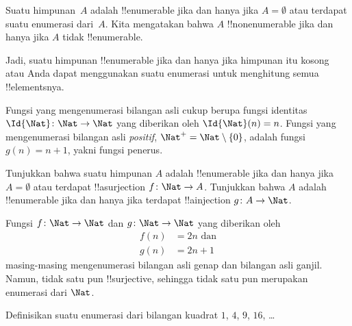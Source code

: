 \documentclass[../../../include/open-logic-section]{subfiles}
\begin{document}
\begin{defn}
  Suatu himpunan~$A$ adalah !!{enumerable} jika dan hanya jika $A =
  \emptyset$ atau terdapat suatu enumerasi dari~$A$. Kita mengatakan bahwa
  $A$ !!{nonenumerable} jika dan hanya jika $A$ tidak !!{enumerable}.
\end{defn}

\begin{explain}
Jadi, suatu himpunan !!{enumerable} jika dan hanya jika himpunan itu kosong
atau Anda dapat menggunakan suatu enumerasi untuk menghitung semua
!!{element}snya.
\end{explain}

\begin{ex}
Fungsi yang mengenumerasi bilangan asli cukup berupa fungsi identitas
$\Id{\Nat} \colon \Nat \to \Nat$ yang diberikan oleh $\Id{\Nat}(n) = n$.
Fungsi yang mengenumerasi bilangan asli \emph{positif}, $\Nat^+ = \Nat
\setminus \{0\}$, adalah fungsi $g(n) = n + 1$, yakni fungsi penerus.
\end{ex}

\begin{prob}
Tunjukkan bahwa suatu himpunan $A$ adalah !!{enumerable} jika dan hanya jika
$A = \emptyset$ atau terdapat !!a{surjection} $f\colon \Nat \to A$. Tunjukkan
bahwa $A$ adalah !!{enumerable} jika dan hanya jika terdapat !!a{injection}
$g\colon A \to \Nat$.
\end{prob}

\begin{ex}
Fungsi $f\colon \Nat \to \Nat$ dan $g \colon \Nat \to \Nat$ yang diberikan
oleh
\begin{align*}
  f(n) & = 2n \text{ dan}\\
  g(n) & = 2n+1
\end{align*}
masing-masing mengenumerasi bilangan asli genap dan bilangan asli ganjil.
Namun, tidak satu pun !!{surjective}, sehingga tidak satu pun merupakan
enumerasi dari $\Nat$.
\end{ex}

\begin{prob}
Definisikan suatu enumerasi dari bilangan kuadrat $1$, $4$, $9$, $16$, \dots
\end{prob}
\end{document}
